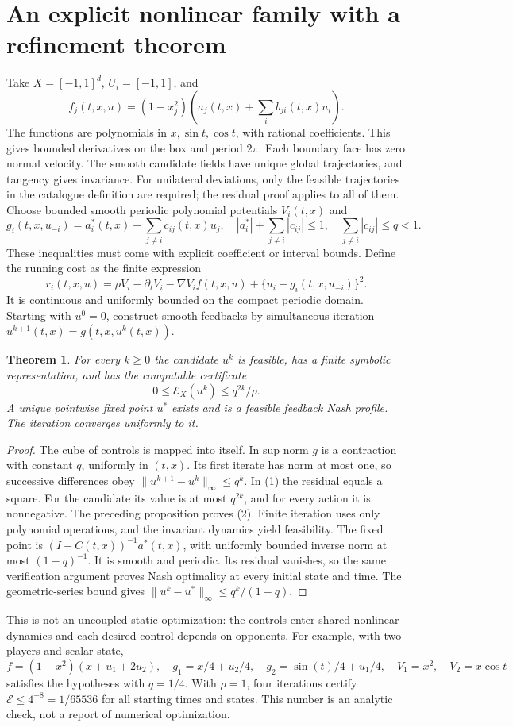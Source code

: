 \documentclass[11pt]{article}
\newtheorem{theorem}{Theorem}
\theoremstyle{definition}
\begin{document}
\section*{An explicit nonlinear family with a refinement theorem}
Take $X=[-1,1]^d$, $U_i=[-1,1]$, and
\[
 f_j(t,x,u)=(1-x_j^2)\left(a_j(t,x)+\sum_i b_{ji}(t,x)u_i\right).
\]
The functions are polynomials in $x,\sin t,\cos t$, with rational coefficients.
This gives bounded derivatives on the box and period $2\pi$. Each boundary
face has zero normal velocity. The smooth candidate fields have unique global trajectories, and tangency
gives invariance. For unilateral deviations, only the feasible trajectories
in the catalogue definition are required; the residual proof applies to all of them.
Choose bounded smooth periodic polynomial potentials $V_i(t,x)$ and
\[
 g_i(t,x,u_{-i})=a_i^*(t,x)+\sum_{j\ne i}c_{ij}(t,x)u_j,
 \quad |a_i^*|+\sum_{j\ne i}|c_{ij}|\le1,
 \quad \sum_{j\ne i}|c_{ij}|\le q<1.
\]
These inequalities must come with explicit coefficient or interval bounds.
Define the running cost as the finite expression
\[
 r_i(t,x,u)=\rho V_i-\partial_tV_i-\nabla V_i f(t,x,u)
              +\{u_i-g_i(t,x,u_{-i})\}^2.                 \tag{1}
\]
It is continuous and uniformly bounded on the compact periodic domain.
Starting with $u^0=0$, construct smooth feedbacks by simultaneous iteration
$u^{k+1}(t,x)=g(t,x,u^k(t,x))$.
\begin{theorem}
For every $k\ge0$ the candidate $u^k$ is feasible, has a finite symbolic
representation, and has the computable certificate
\[
 0\le\mathcal E_X(u^k)\le q^{2k}/\rho.                  \tag{2}
\]
A unique pointwise fixed point $u^*$ exists and is a feasible feedback Nash
profile. The iteration converges uniformly to it.
\end{theorem}
\begin{proof}
The cube of controls is mapped into itself. In sup norm $g$ is a contraction
with constant $q$, uniformly in $(t,x)$. Its first iterate has norm at most
one, so successive differences obey
$\|u^{k+1}-u^k\|_\infty\le q^k$. In (1) the residual equals a square.
For the candidate its value is at most $q^{2k}$, and for every action it is
nonnegative. The preceding proposition proves (2). Finite iteration uses
only polynomial operations, and the invariant dynamics yield feasibility.
The fixed point is $(I-C(t,x))^{-1}a^*(t,x)$, with uniformly bounded inverse
norm at most $(1-q)^{-1}$. It is smooth and periodic. Its residual vanishes,
so the same verification argument proves Nash optimality at every initial
state and time. The geometric-series bound gives
$\|u^k-u^*\|_\infty\le q^k/(1-q)$.
\end{proof}
This is not an uncoupled static optimization: the controls enter shared
nonlinear dynamics and each desired control depends on opponents. For example,
with two players and scalar state,
\[
 f=(1-x^2)(x+u_1+2u_2),\quad
 g_1=x/4+u_2/4,\quad g_2=\sin(t)/4+u_1/4,
 \quad V_1=x^2,\quad V_2=x\cos t
\]
satisfies the hypotheses with $q=1/4$. With $\rho=1$, four iterations certify
$\mathcal E\le4^{-8}=1/65536$ for all starting times and states. This number
is an analytic check, not a report of numerical optimization.
\end{document}
